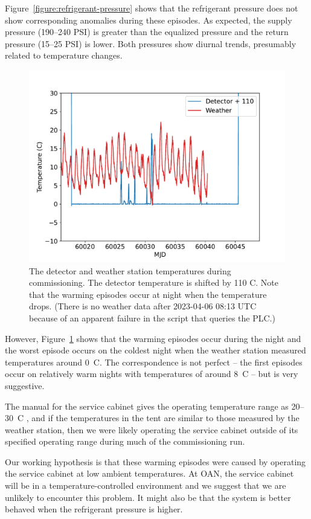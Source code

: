 \documentclass{article}
\begin{document}
Figure~\ref{figure:refrigerant-pressure} shows that the refrigerant pressure does not show corresponding anomalies during these episodes. As expected, the supply pressure (190--240 PSI) is greater than the equalized pressure and the return pressure (15--25 PSI) is lower. Both pressures show diurnal trends, presumably related to temperature changes.

\begin{figure}[pb]
\begin{center}
\includegraphics[width=0.7\columnwidth]{figures/temperature-stability-c.pdf}
\medskip
\caption{The detector and weather station temperatures during commissioning. The detector temperature is shifted by 110 C. Note that the warming episodes occur at night when the temperature drops. (There is no weather data after 2023-04-06 08:13 UTC because of an apparent failure in the script that queries the PLC.)}
\label{figure:temperature-stability-c}
\end{center}
\end{figure}

However, Figure~\ref{figure:temperature-stability-c} shows that the warming episodes occur during the night and the worst episode occurs on the coldest night when the weather station measured temperatures around 0~C. The correspondence is not perfect -- the first episodes occur on relatively warm nights with temperatures of around 8~C -- but is very suggestive. 

The manual for the service cabinet gives the operating temperature range as 20--30~C \cite[p.~7]{service-cabinet}, and if the temperatures in the tent are similar to those measured by the weather station, then we were likely operating the service cabinet outside of its specified operating range during much of the commissioning run.

Our working hypothesis is that these warming episodes were caused by operating the service cabinet at low ambient temperatures. At OAN, the service cabinet will be in a temperature-controlled environment and we suggest that we are unlikely to encounter this problem. It might also be that the system is better behaved when the refrigerant pressure is higher.
\end{document}
